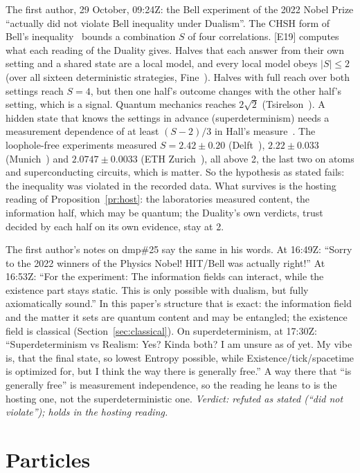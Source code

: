 \documentclass[11pt,a4paper]{article}
\theoremstyle{definition}
\theoremstyle{remark}
\newcommand{\chk}[1]{\textsf{[#1]}}
\begin{document}
The first author, 29 October, 09:24Z: the Bell experiment of the 2022 Nobel Prize ``actually did not violate Bell inequality under
Dualism''. The CHSH form of Bell's inequality~\cite{chsh} bounds a combination $S$ of four correlations. \chk{E19} computes what each
reading of the Duality gives. Halves that each answer from their own setting and a shared state are a local model, and every local model
obeys $|S|\le2$ (over all sixteen deterministic strategies, Fine~\cite{fine}). Halves with full reach over both settings reach $S=4$, but
then one half's outcome changes with the other half's setting, which is a signal. Quantum mechanics reaches $2\sqrt2$
(Tsirelson~\cite{cirelson}). A hidden state that knows the settings in advance (superdeterminism) needs a measurement dependence of at
least $(S-2)/3$ in Hall's measure~\cite{hall}. The loophole-free experiments measured $S=2.42\pm0.20$ (Delft~\cite{hensen}),
$2.22\pm0.033$ (Munich~\cite{rosenfeld}) and $2.0747\pm0.0033$ (ETH Zurich~\cite{storz}), all above 2, the last two on atoms and
superconducting circuits, which is matter. So the hypothesis as stated fails: the inequality was violated in the recorded data. What
survives is the hosting reading of Proposition~\ref{pr:host}: the laboratories measured content, the information half, which may be
quantum; the Duality's own verdicts, trust decided by each half on its own evidence, stay at 2.

The first author's notes on dmp\#25 say the same in his words. At 16:49Z: ``Sorry to the 2022 winners of the Physics Nobel! HIT/Bell was
actually right!'' At 16:53Z: ``For the experiment: The information fields can interact, while the existence part stays static. This is
only possible with dualism, but fully axiomatically sound.'' In this paper's structure that is exact: the information field and the matter
it sets are quantum content and may be entangled; the existence field is classical (Section~\ref{sec:classical}). On superdeterminism, at
17:30Z: ``Superdeterminism vs Realism: Yes? Kinda both? I am unsure as of yet. My vibe is, that the final state, so lowest Entropy possible,
while Existence/tick/spacetime is optimized for, but I think the way there is generally free.'' A way there that ``is generally free'' is
measurement independence, so the reading he leans to is the hosting one, not the superdeterministic one. \emph{Verdict: refuted as
stated (``did not violate''); holds in the hosting reading.}

\section{Particles}\label{sec:particles}
\end{document}
